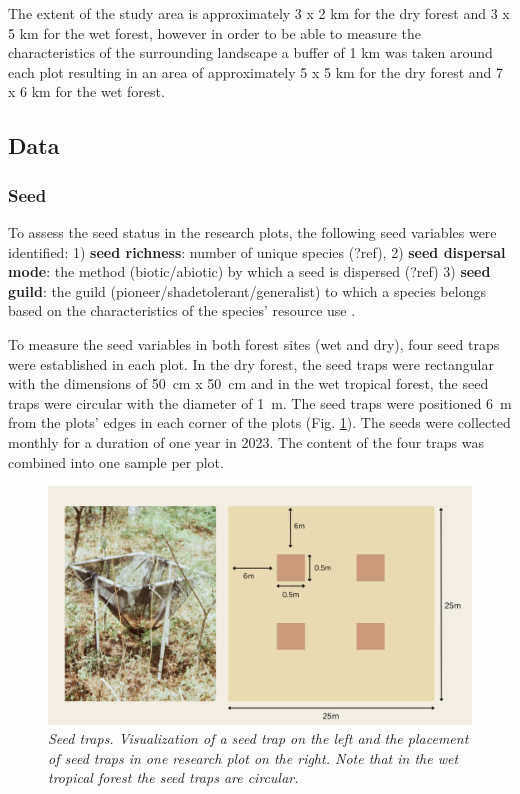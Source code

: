 The extent of the study area is approximately 3 x 2 km for the dry forest and 3 x 5 km for the wet forest, however in order to be able to measure the characteristics of the surrounding landscape a buffer of 1 km was taken around each plot resulting in an area of approximately 5 x 5 km for the dry forest and 7 x 6 km for the wet forest.

\subsection{Data}

\subsubsection{Seed}
To assess the seed status in the research plots, the following seed variables were identified: 1) \textbf{seed richness}: number of unique species (?ref), 2) \textbf{seed dispersal mode}: the method (biotic/abiotic) by which a seed is dispersed (?ref)  3) \textbf{seed guild}: the guild (pioneer/shadetolerant/generalist) to which a species belongs based on the characteristics of the species' resource use \citep{blondelGuildsFunctionalGroups2003}. 

To measure the seed variables in both forest sites (wet and dry), four seed traps were established in each plot. In the dry forest, the seed traps were rectangular with the dimensions of 50~cm x 50~cm and in the wet tropical forest, the seed traps were circular with the diameter of 1~m. The seed traps were positioned 6~m from the plots’ edges in each corner of the plots (Fig. \ref{fig:st}). The seeds were collected monthly for a duration of one year in 2023. The content of the four traps was combined into one sample per plot.

\begin{figure}[htbp]
\centering
\includegraphics[width=\linewidth, keepaspectratio]{Report/figures/02_seedtraps.pdf}
\caption{\textit{Seed traps. Visualization of a seed trap on the left and the placement of seed traps in one research plot on the right. Note that in the wet tropical forest the seed traps are circular.}}
\label{fig:st}
\end{figure}

